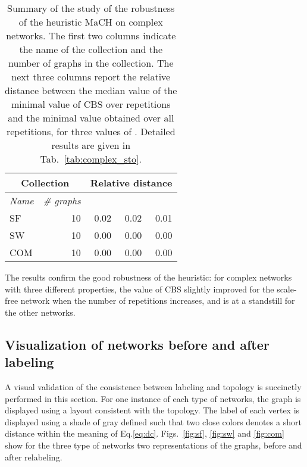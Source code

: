 \documentclass{scrartcl}
\theoremstyle{plain}
\newcommand{\algo}{MaCH}
\newcommand{\cbs}{CBS}
\begin{document}
\begin{table}[!ht]
	\centering
	\small
	\begin{tabular}{|lr|rrr|}
		\hline
		\multicolumn{2}{|c|}{\textbf{Collection}} & 
		\multicolumn{3}{c|}{\textbf{Relative distance}} \\
		\hline
		\multicolumn{1}{|c}{\emph{Name}} & 
		\multicolumn{1}{c|}{\emph{\# graphs}} & 
		\multicolumn{1}{c}{} & 
		\multicolumn{1}{c}{} & 
		\multicolumn{1}{c|}{} \\ \hline

		\makeatletter{}SF & 10 & 0.02 & 0.02 & 0.01 \\ 
SW & 10 & 0.00 & 0.00 & 0.00 \\ 
COM & 10 & 0.00 & 0.00 & 0.00 \\ 
 
		\hline

\end{tabular}

\caption{\label{tab:complex_sto_sum}Summary of the study of the robustness of 
the heuristic \algo{} on complex networks.  The first two columns indicate the 
name of the collection and the number of graphs in the collection. The next 
three columns report the relative distance between the median value of the 
minimal value of \cbs{} over  repetitions and the minimal value obtained over 
all repetitions, for three values of . Detailed results are given in 
Tab.~\ref{tab:complex_sto}.}
\end{table}

The results confirm the good robustness of the heuristic: for complex networks 
with three different properties, the value of \cbs{} slightly improved for the 
scale-free network when the number of repetitions increases, and is at a 
standstill for the other networks.


\subsection{Visualization of networks before and after labeling}
A visual validation of the consistence between labeling and topology is 
succinctly performed in this section. For one instance of each type of networks, 
the graph is displayed using a layout consistent with the topology. The label of 
each vertex is displayed using a shade of gray defined such that two close 
colors denotes a short distance within the meaning of Eq.\ref{eq:dc}. 
Figs.~\ref{fig:sf}, \ref{fig:sw} and \ref{fig:com} show for the three type of 
networks two representations of the graphs, before and after relabeling. 
\end{document}
